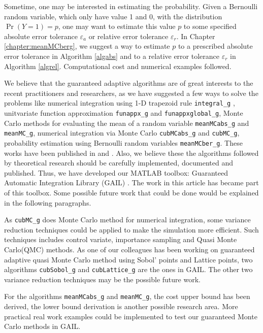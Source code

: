\documentclass{iitthesis}
\begin{document}
Sometime, one may be interested in estimating the probability. Given a Bernoulli random variable, which only have value 1 and 0, with the distribution $\Pr(Y =1) = p$, one may want to estimate this value $p$ to some specified absolute error tolerance $\varepsilon_a$ or relative error tolerance $\varepsilon_r$. In Chapter \ref{chapter:meanMCberg}, we suggest a way to estimate $p$ to a prescribed absolute error tolerance in Algorithm \ref{algabs} and to a relative error tolerance $\varepsilon_r$ in Algorithm \ref{algrel}. Computational cost and numerical examples followed.


\label{chapter: future work}
We believe that the guaranteed adaptive algorithms are of great interests to the recent practitioners and researchers, as we have suggested a few ways to solve the problems like numerical integration using 1-D trapezoid rule {\tt integral\_g} , unitvariate function approximation {\tt funappx\_g} and {\tt funappxglobal\_g}, Monte Carlo methods for evaluating the mean of a random variable {\tt meanMCabs\_g} and {\tt meanMC\_g}, numerical integration via Monte Carlo {\tt cubMCabs\_g} and {\tt cubMC\_g}, probability estimation using Bernoulli random variables {\tt meanMCber\_g}. These works have been published in \cite{CDHHZ13} and \cite{HJLO12}. Also, we believe these the algorithms followed by theoretical research should be carefully implemented, documented and published. Thus, we have developed our MATLAB toolbox: Guaranteed Automatic Integration Library (GAIL) \cite{GAIL_1_3}. The work in this article has became part of this toolbox. Some possible future work that could be done would be explained in the following paragraphs.

As {\tt cubMC\_g} does Monte Carlo method for numerical integration, some variance reduction techniques could be applied to make the simulation more efficient. Such techniques includes control variate, importance sampling and Quasi Monte Carlo(QMC) methods. As one of our colleagues has been working on guaranteed adaptive quasi Monte Carlo method using Sobol' points \cite{Sobol67} and Lattice points, two algorithms {\tt cubSobol\_g} and {\tt cubLattice\_g} are the ones in GAIL. The other two variance reduction techniques may be the possible future work.

For the algorithms {\tt meanMCabs\_g} and {\tt meanMC\_g}, the cost upper bound has been derived, the lower bound derivation is another possible research area. More practical real work examples could be implemented to test our guaranteed Monte Carlo methods in GAIL.
\end{document}
